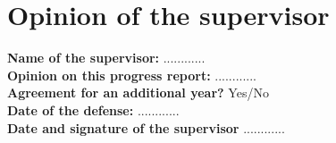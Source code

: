 \documentclass[11pt]{article}
\begin{document}
\section*{Opinion of the supervisor}

\noindent\textbf{Name of the supervisor:}
............
\\

\noindent\textbf{Opinion on this progress report:}
............
\\

\noindent\textbf{Agreement for an additional year?}
Yes/No
\\

\noindent\textbf{Date of the defense:}
............
\\

\bigskip
\bigskip
\noindent\textbf{Date and signature of the supervisor}
............
\end{document}
